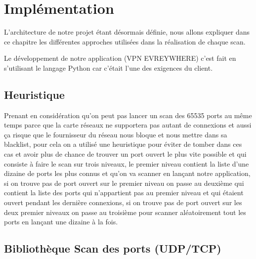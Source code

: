 \documentclass[12pt,a4paper]{article}
\begin{document}
\section{Implémentation}

L’architecture de notre projet étant désormais définie, nous allons expliquer dans ce chapitre les différentes approches utilisées dans la réalisation de chaque scan.

Le développement de notre application (VPN EVREYWHERE) c’est fait en s’utilisant le langage Python  car c’était l’une des exigences du client.
\subsection{Heuristique}

	Prenant en considération qu'on peut pas lancer un scan des 65535 ports au même temps parce que la carte réseaux ne supportera pas autant de connexions et aussi ça risque que le fournisseur du réseau nous bloque et nous mettre dans sa blacklist, pour cela on a utilisé une heuristique  pour éviter de tomber dans ces cas et avoir plus de chance de trouver un port ouvert le plus vite possible et qui consiste à faire le scan sur trois niveaux, le premier niveau contient la liste d'une dizaine de ports les plus connus et qu'on va scanner en lançant notre application, si on trouve pas de port ouvert sur le premier niveau on passe au deuxième qui contient la liste des ports qui n'appartient pas au premier niveau et qui étaient ouvert pendant les dernière connexions, si on trouve pas de port ouvert sur les deux premier niveaux on passe au troisième pour scanner aléatoirement tout les ports en lançant une dizaine à la fois.

\subsection{Bibliothèque Scan des ports (UDP/TCP)}
\end{document}
